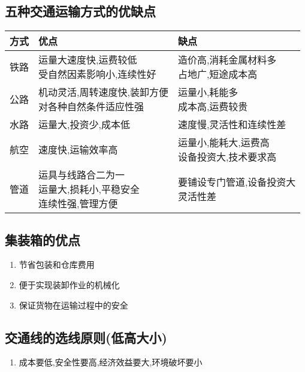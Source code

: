 \documentclass[a4paper]{article}
\begin{document}
    \subsection{五种交通运输方式的优缺点}
        \begin{tabular}{|c|l|l|}
            \hline
            方式   &   优点   &  缺点    \\
            \hline
            铁路   &   \makecell[l]{运量大速度快,运费较低 \\ 受自然因素影响小,连续性好}  &  \makecell[l]{造价高,消耗金属材料多 \\ 占地广,短途成本高} \\
            \hline
            公路   &    \makecell[l]{机动灵活,周转速度快,装卸方便 \\ 对各种自然条件适应性强} &  \makecell[l]{运量小,耗能多 \\ 成本高,运费较贵}   \\
            \hline
            水路   &   运量大,投资少,成本低    &    速度慢,灵活性和连续性差   \\
            \hline
            航空   &    速度快,运输效率高  & \makecell[l]{运量小,能耗大,运费高 \\ 设备投资大,技术要求高}  \\
            \hline
            管道   &  \makecell[l]{运具与线路合二为一 \\ 运量大,损耗小,平稳安全 \\ 连续性强,管理方便}   &    \makecell[l]{要铺设专门管道,设备投资大 \\ 灵活性差}   \\
            \hline
        \end{tabular}
    \subsection{集装箱的优点}
    \begin{enumerate}
        \item 节省包装和仓库费用
        \item 便于实现装卸作业的机械化
        \item 保证货物在运输过程中的安全
    \end{enumerate}
    \subsection{交通线的选线原则(低高大小)}
    \begin{enumerate}
        \item 成本要低,安全性要高,经济效益要大,环境破坏要小
    \end{enumerate}
\end{document}
